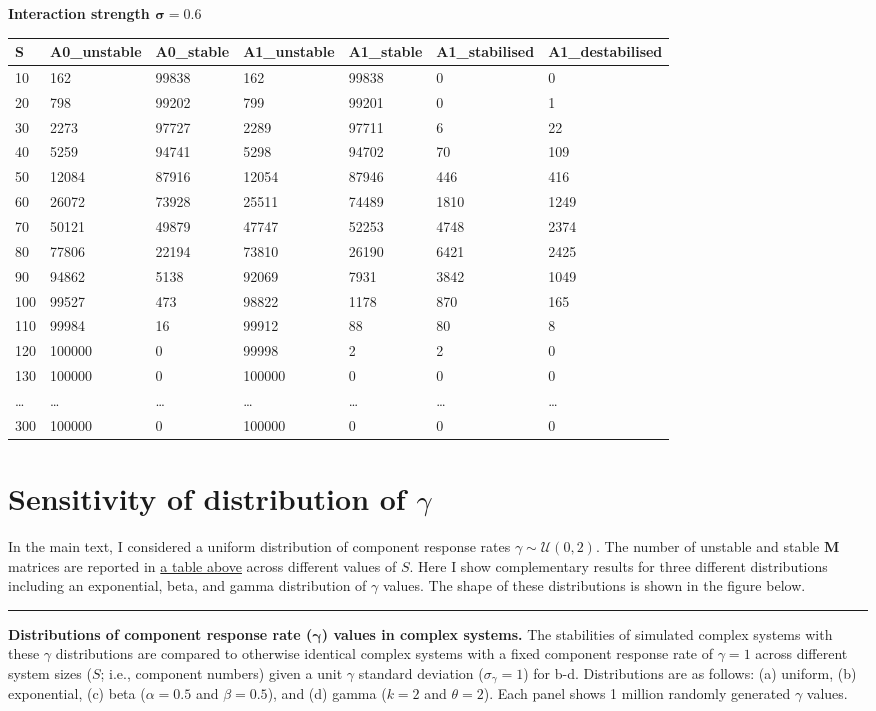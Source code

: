 \documentclass[]{article}
\begin{document}
\textbf{Interaction strength \(\mathbf{\sigma = 0.6}\)}

\begin{longtable}[]{@{}lllllll@{}}
\toprule
S & A0\_unstable & A0\_stable & A1\_unstable & A1\_stable &
A1\_stabilised & A1\_destabilised\tabularnewline
\midrule
\endhead
10 & 162 & 99838 & 162 & 99838 & 0 & 0\tabularnewline
20 & 798 & 99202 & 799 & 99201 & 0 & 1\tabularnewline
30 & 2273 & 97727 & 2289 & 97711 & 6 & 22\tabularnewline
40 & 5259 & 94741 & 5298 & 94702 & 70 & 109\tabularnewline
50 & 12084 & 87916 & 12054 & 87946 & 446 & 416\tabularnewline
60 & 26072 & 73928 & 25511 & 74489 & 1810 & 1249\tabularnewline
70 & 50121 & 49879 & 47747 & 52253 & 4748 & 2374\tabularnewline
80 & 77806 & 22194 & 73810 & 26190 & 6421 & 2425\tabularnewline
90 & 94862 & 5138 & 92069 & 7931 & 3842 & 1049\tabularnewline
100 & 99527 & 473 & 98822 & 1178 & 870 & 165\tabularnewline
110 & 99984 & 16 & 99912 & 88 & 80 & 8\tabularnewline
120 & 100000 & 0 & 99998 & 2 & 2 & 0\tabularnewline
130 & 100000 & 0 & 100000 & 0 & 0 & 0\tabularnewline
\ldots{} & \ldots{} & \ldots{} & \ldots{} & \ldots{} & \ldots{} &
\ldots{}\tabularnewline
300 & 100000 & 0 & 100000 & 0 & 0 & 0\tabularnewline
\bottomrule
\end{longtable}

\hypertarget{gam_dist}{\section{\texorpdfstring{Sensitivity of
distribution of
\(\gamma\)}{Sensitivity of distribution of \textbackslash{}gamma}}\label{gam_dist}}

In the main text, I considered a uniform distribution of component
response rates \(\gamma \sim \mathcal{U}(0, 2)\). The number of unstable
and stable \(\mathbf{M}\) matrices are reported in
\protect\hyperlink{IncrS}{a table above} across different values of
\(S\). Here I show complementary results for three different
distributions including an exponential, beta, and gamma distribution of
\(\gamma\) values. The shape of these distributions is shown in the
figure below.

\begin{center}\rule{0.5\linewidth}{\linethickness}\end{center}

\textbf{Distributions of component response rate
(\(\boldsymbol{\gamma}\)) values in complex systems.} The stabilities of
simulated complex systems with these \(\gamma\) distributions are
compared to otherwise identical complex systems with a fixed component
response rate of \(\gamma = 1\) across different system sizes (\(S\);
i.e., component numbers) given a unit \(\gamma\) standard deviation
(\(\sigma_{\gamma} = 1\)) for b-d. Distributions are as follows: (a)
uniform, (b) exponential, (c) beta (\(\alpha = 0.5\) and
\(\beta = 0.5\)), and (d) gamma (\(k = 2\) and \(\theta = 2\)). Each
panel shows 1 million randomly generated \(\gamma\) values.
\end{document}
